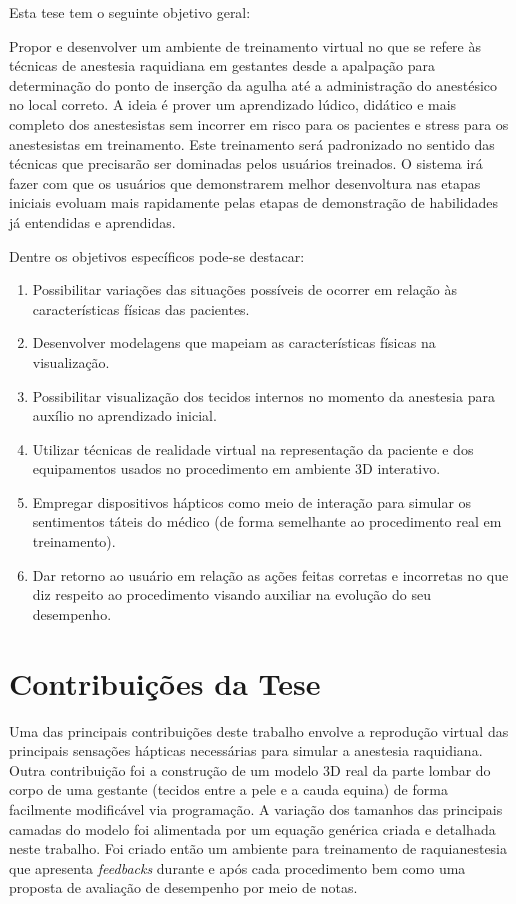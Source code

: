 Esta tese tem o seguinte objetivo geral:

Propor e desenvolver um ambiente de treinamento virtual no que se refere às técnicas de anestesia raquidiana em gestantes desde a apalpação para determinação do ponto de inserção da agulha até a administração do anestésico no local correto. A ideia é prover um aprendizado lúdico, didático e mais completo dos anestesistas sem incorrer em risco para os pacientes e stress para os anestesistas em treinamento. Este treinamento será padronizado no sentido das técnicas que precisarão ser dominadas pelos usuários treinados. O sistema irá fazer com que os usuários que demonstrarem melhor desenvoltura nas etapas iniciais evoluam mais rapidamente pelas etapas de demonstração de habilidades já entendidas e aprendidas. 

Dentre os objetivos específicos pode-se destacar:
\begin{enumerate}
\item Possibilitar variações das situações possíveis de ocorrer em relação às características físicas das pacientes. 
\item Desenvolver modelagens que mapeiam as características físicas na visualização. 
\item Possibilitar visualização dos tecidos internos no momento da anestesia para auxílio no aprendizado inicial. 
\item Utilizar técnicas de realidade virtual na representação da paciente e dos equipamentos usados no procedimento em ambiente 3D interativo.
\item Empregar dispositivos hápticos como meio de interação para simular os sentimentos táteis do médico (de forma semelhante ao procedimento real em treinamento). 
\item Dar retorno ao usuário em relação as ações feitas corretas e incorretas no que diz respeito ao procedimento visando auxiliar na evolução do seu desempenho.
\end{enumerate}

\section{Contribuições da Tese}
\label{sec:contribuicoes}

Uma das principais contribuições deste trabalho envolve a reprodução virtual das principais sensações hápticas necessárias para simular a anestesia raquidiana. Outra contribuição foi a construção de um modelo 3D real da parte lombar do corpo de uma gestante (tecidos entre a pele e a cauda equina) de forma facilmente modificável via programação. A variação dos tamanhos das principais camadas do modelo foi alimentada por um equação genérica criada e detalhada neste trabalho. Foi criado então um ambiente para treinamento de raquianestesia que apresenta \textit{feedbacks} durante e após cada
procedimento bem como uma proposta de avaliação de desempenho por meio de notas.

